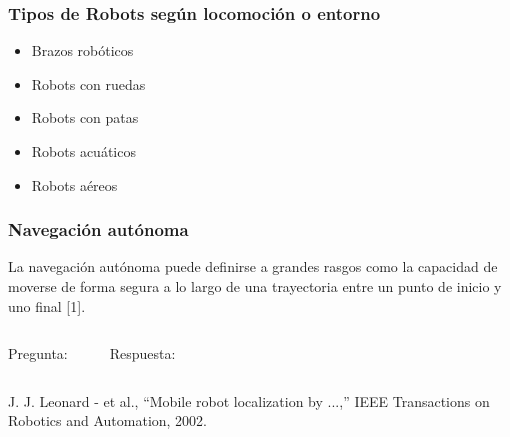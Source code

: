 \begin{frame}
    \frametitle{Tipos de Robots según locomoción o entorno}

    \begin{itemize}
        \item Brazos robóticos
        \item Robots con ruedas
        \item Robots con patas
        \item Robots acuáticos
        \item Robots aéreos
    \end{itemize}

\end{frame}


\begin{frame}
    \frametitle{Navegación autónoma}
    \begin{block}{}
        La navegación autónoma puede definirse a grandes rasgos como la capacidad de moverse de forma segura a lo largo de una trayectoria entre un punto de inicio y uno final [1].
    \end{block}
    \vspace{5mm}
    \footnotesize
    \begin{columns}[t]
        \hspace{13pt}Pregunta:
        \begin{enumerate}
        \end{enumerate}
        Respuesta:
        \begin{enumerate}[$\rightarrow$]
        \end{enumerate}
    \end{columns}
    \vfill
    \begin{tiny}
        [1] J. J. Leonard - et al., ``Mobile robot localization by ...,'' IEEE Transactions on Robotics and Automation, 2002.
    \end{tiny}
\end{frame}

